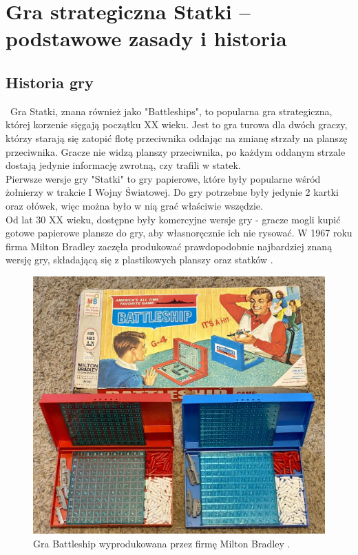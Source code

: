 \newpage %
\section{Gra strategiczna Statki – podstawowe zasady i historia}

\subsection{Historia gry}
\indent\ Gra Statki, znana również jako "Battleships", to popularna gra strategiczna, której korzenie sięgają początku XX wieku. Jest to gra turowa dla dwóch graczy, którzy starają się zatopić flotę przeciwnika oddając na zmianę strzały na planszę przeciwnika. Gracze nie widzą planszy przeciwnika, po każdym oddanym strzale dostają jedynie informację zwrotną, czy trafili w statek.
\\ \indent Pierwsze wersje gry "Statki" to gry papierowe, które były popularne wśród żołnierzy w trakcie I Wojny Światowej. Do gry potrzebne były jedynie 2 kartki oraz ołówek, więc można było w nią grać właściwie wszędzie. \cite{historyWiki}
\\ \indent Od lat 30 XX wieku, dostępne były komercyjne wersje gry - gracze mogli kupić gotowe papierowe plansze do gry, aby własnoręcznie ich nie rysować. W 1967 roku firma Milton Bradley zaczęła produkować prawdopodobnie najbardziej znaną wersję gry, składającą się z plastikowych planszy oraz statków \cite{historyWiki} \cite{museumOfGames}.

\begin{figure}[!h]
    \label{fig:milton-bradley-game}
    \centering \includegraphics[width=0.8\linewidth]{img/milton_bradley_game.jpg}
    \caption{Gra Battleship wyprodukowana przez firmę Milton Bradley \cite{eBay}.}
\end{figure}

